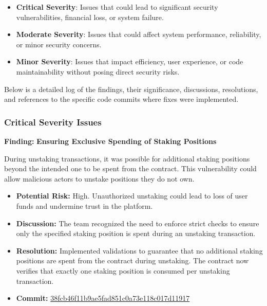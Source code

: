 \documentclass{article}
\begin{document}
\begin{itemize}
    \item \textbf{Critical Severity}: Issues that could lead to significant security vulnerabilities, financial loss, or system failure.
    \item \textbf{Moderate Severity}: Issues that could affect system performance, reliability, or minor security concerns.
    \item \textbf{Minor Severity}: Issues that impact efficiency, user experience, or code maintainability without posing direct security risks.
\end{itemize}

Below is a detailed log of the findings, their significance, discussions, resolutions, and references to the specific code commits where fixes were implemented.

\subsubsection{Critical Severity Issues}

\begin{criticalbox}
\textbf{Finding:} \textbf{Ensuring Exclusive Spending of Staking Positions}

During unstaking transactions, it was possible for additional staking positions beyond the intended one to be spent from the contract. This vulnerability could allow malicious actors to unstake positions they do not own.

\begin{itemize}[label=$\diamond$]
    \item \textbf{Potential Risk:} High. Unauthorized unstaking could lead to loss of user funds and undermine trust in the platform.
    \item \textbf{Discussion:} The team recognized the need to enforce strict checks to ensure only the specified staking position is spent during an unstaking transaction.
    \item \textbf{Resolution:} Implemented validations to guarantee that no additional staking positions are spent from the contract during unstaking. The contract now verifies that exactly one staking position is consumed per unstaking transaction.
    \item \textbf{Commit:} \href{https://github.com/MuesliSwapTeam/muesliswap-decentralized-farming/commit/38fcb46f11b9ae5fad851c0a73e118c017d11917}{38fcb46f11b9ae5fad851c0a73e118c017d11917}
\end{itemize}
\end{criticalbox}
\end{document}
